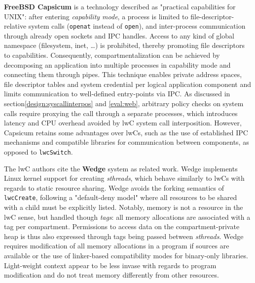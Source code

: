 \documentclass[10pt,twocolumn,letter]{article}
\begin{document}
\textbf{FreeBSD Capsicum} is a technology described as "practical capabilities for UNIX":
after entering \textit{capability mode}, a process is limited to file-descriptor-relative system calls (\lstinline{openat} instead of \lstinline{open}), and inter-process communication through already open sockets and IPC handles.
Access to any kind of global namespace (filesystem, inet, \dots) is prohibited, thereby promoting file descriptors to capabilities.
Consequently, compartmentalization can be achieved by decomposing an application into multiple processes in capability mode and connecting them through pipes.
This technique enables private address spaces, file descriptor tables and system credential per logical application component and limits communication to well-defined entry-points via IPC.
As discussed in section\ref{design:syscallinterpos} and \ref{eval:web}, arbitrary policy checks on system calls require proxying the call through a separate processes, which introduces latency and CPU overhead avoided by lwC system call interposition.
However, Capsicum retains some advantages over lwCs, such as the use of established IPC mechanisms and compatible libraries for communication between components, as opposed to \lstinline{lwcSwitch}.
\cite{watson2010capsicum}


The lwC authors cite the \textbf{Wedge} system as related work.
Wedge implements Linux kernel support for creating \textit{sthreads}, which behave similarly to lwCs with regards to static resource sharing.
Wedge avoids the forking semantics of \lstinline{lwcCreate}, following a "default-deny model" where all resources to be shared with a child must be explicitly listed.
Notably, memory is not a resource in the lwC sense, but handled though \textit{tags}: all memory allocations are associated with a tag per compartment.
Permissions to access data on the compartment-private heap is thus also expressed through tags being passed between \textit{sthreads}.
Wedge requires modification of all memory allocations in a program if sources are available or the use of linker-based compatibility modes for binary-only libraries.
Light-weight context appear to be less invase with regards to program modification and do not treat memory differently from other resources.
\cite{bittau2008wedge}
\end{document}
